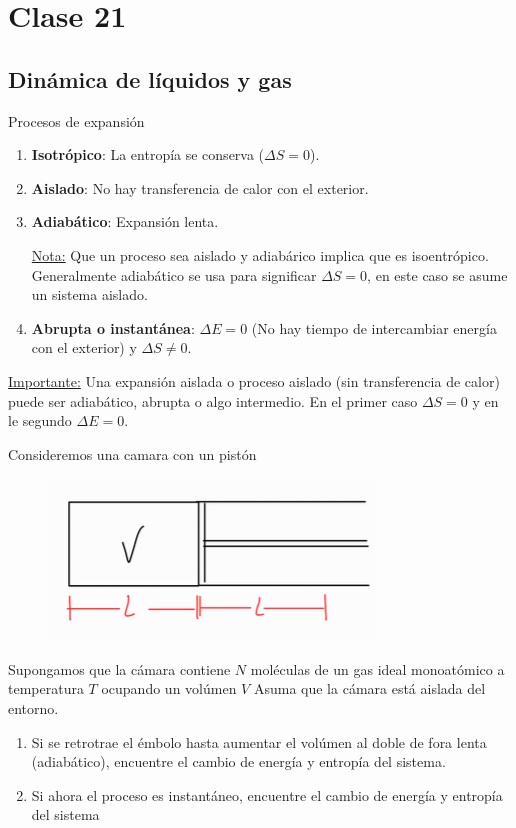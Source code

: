 \section{Clase 21}
\subsection{Dinámica de líquidos y gas}
Procesos de expansión
\begin{enumerate}
	\item \textbf{Isotrópico}: La entropía se conserva ($\Delta S=0$).
	\item \textbf{Aislado}: No hay transferencia de calor con el exterior.
	\item \textbf{Adiabático}: Expansión lenta.


\underline{Nota:} Que un proceso sea aislado y adiabárico implica que es isoentrópico. Generalmente adiabático se usa para significar $\Delta S=0$, en este caso se asume un sistema aislado.

\item \textbf{Abrupta o instantánea}: $\Delta E=0$ (No hay tiempo de intercambiar energía con el exterior) y $\Delta S\neq 0$.
\end{enumerate}

\underline{Importante:} Una expansión aislada o proceso aislado (sin transferencia de calor) puede ser adiabático, abrupta o algo intermedio. En el primer caso $\Delta S=0$ y en le segundo $\Delta E=0$.

\begin{ej}
	Consideremos una camara con un pistón 
	\begin{figure}[h!]
		\centering
		\includegraphics[scale=0.5]{fig/21-img.png}
	\end{figure}
\end{ej}
  
Supongamos que la cámara contiene $N$ moléculas de un gas ideal monoatómico a temperatura $T$ ocupando un volúmen $V$ Asuma que la cámara está aislada del entorno.
\begin{enumerate}
	\item Si se retrotrae el émbolo hasta aumentar el volúmen al doble de fora lenta (adiabático), encuentre el cambio de energía y entropía del sistema.
	\item Si ahora el proceso es instantáneo, encuentre el cambio de energía y entropía del sistema
\end{enumerate}

